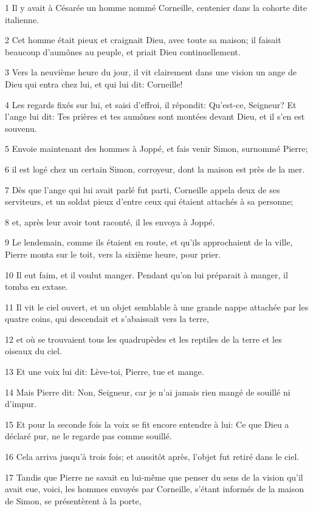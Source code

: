 \par 1 Il y avait à Césarée un homme nommé Corneille, centenier dans la cohorte dite italienne.
\par 2 Cet homme était pieux et craignait Dieu, avec toute sa maison; il faisait beaucoup d'aumônes au peuple, et priait Dieu continuellement.
\par 3 Vers la neuvième heure du jour, il vit clairement dans une vision un ange de Dieu qui entra chez lui, et qui lui dit: Corneille!
\par 4 Les regards fixés sur lui, et saisi d'effroi, il répondit: Qu'est-ce, Seigneur? Et l'ange lui dit: Tes prières et tes aumônes sont montées devant Dieu, et il s'en est souvenu.
\par 5 Envoie maintenant des hommes à Joppé, et fais venir Simon, surnommé Pierre;
\par 6 il est logé chez un certain Simon, corroyeur, dont la maison est près de la mer.
\par 7 Dès que l'ange qui lui avait parlé fut parti, Corneille appela deux de ses serviteurs, et un soldat pieux d'entre ceux qui étaient attachés à sa personne;
\par 8 et, après leur avoir tout raconté, il les envoya à Joppé.
\par 9 Le lendemain, comme ils étaient en route, et qu'ils approchaient de la ville, Pierre monta sur le toit, vers la sixième heure, pour prier.
\par 10 Il eut faim, et il voulut manger. Pendant qu'on lui préparait à manger, il tomba en extase.
\par 11 Il vit le ciel ouvert, et un objet semblable à une grande nappe attachée par les quatre coins, qui descendait et s'abaissait vers la terre,
\par 12 et où se trouvaient tous les quadrupèdes et les reptiles de la terre et les oiseaux du ciel.
\par 13 Et une voix lui dit: Lève-toi, Pierre, tue et mange.
\par 14 Mais Pierre dit: Non, Seigneur, car je n'ai jamais rien mangé de souillé ni d'impur.
\par 15 Et pour la seconde fois la voix se fit encore entendre à lui: Ce que Dieu a déclaré pur, ne le regarde pas comme souillé.
\par 16 Cela arriva jusqu'à trois fois; et aussitôt après, l'objet fut retiré dans le ciel.
\par 17 Tandis que Pierre ne savait en lui-même que penser du sens de la vision qu'il avait eue, voici, les hommes envoyés par Corneille, s'étant informés de la maison de Simon, se présentèrent à la porte,
